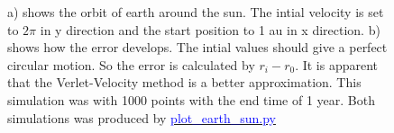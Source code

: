 \begin{figure}[H]
\begin{subfigure}{0.5\textwidth}
        \caption{}
    \end{subfigure}
    \caption{a) shows the orbit of earth around the sun. The intial velocity is set to $2\pi$ in y direction and the start position to 1 au in x direction. b) shows how the error develops. The intial values should give a perfect circular motion. So the error is calculated by $r_i - r_{0}$. It is apparent that the Verlet-Velocity method is a better approximation. This simulation was with 1000 points with the end time of 1 year. Both simulations was produced by \href{https://github.com/erikfsk/Project-3/tree/master/Project3/earth-sun-standard-results}{\textcolor{blue}{plot\_earth\_sun.py}}}
    \label{fig:earth-sun}
\end{figure}
